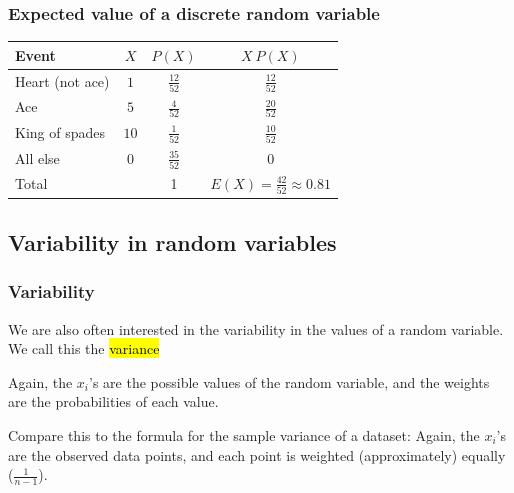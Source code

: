 \documentclass[slidestop,compress,mathserif]{beamer}
\begin{document}

\begin{frame}
\frametitle{Expected value of a discrete random variable}


\begin{center}
\renewcommand{\arraystretch}{1.5}
\begin{tabular}{l | c | c | c }
Event		& $X$ 		& $P(X)$        		& $X ~ P(X)$ \\
\hline
Heart (not ace)	& $1$		& $\frac{12}{52}$	& $\frac{12}{52}$ \\
Ace			& $5$		& $\frac{4}{52}$	& $\frac{20}{52}$ \\	
King of spades	& $10$		& $\frac{1}{52}$	& $\frac{10}{52}$ \\	
All else		& $0$		& $\frac{35}{52}$	& $0$ \\
\hline
Total			&			&		1		& $E(X) = \frac{42}{52} \approx 0.81$
\end{tabular}

\end{center}

\end{frame}


\subsection{Variability in random variables}


\begin{frame}
\frametitle{Variability}

We are also often interested in the variability in the values of a random variable. We call this the \hl{variance}

\formula{
\[ \sigma^2 = Var(X) = \sum_{i = 1}^k (x_i - E(X))^2 P(X = x_i) \]
\[ \sigma = SD(X) = \sqrt{Var(X)} \]
}
Again, the $x_i$'s are the possible values of the random variable, and the weights are the probabilities of each value.

\pause
\begin{small}
Compare this to the formula for the sample variance of a dataset:
\formula{\[ s^2 = \frac{1}{n-1} \sum_{i = 1}^n (x_i - \bar{x})^2 \]}
Again, the $x_i$'s are the observed data points, and each point is weighted (approximately) equally ($\frac{1}{n-1}$).
\end{small}

\end{frame}
\end{document}

